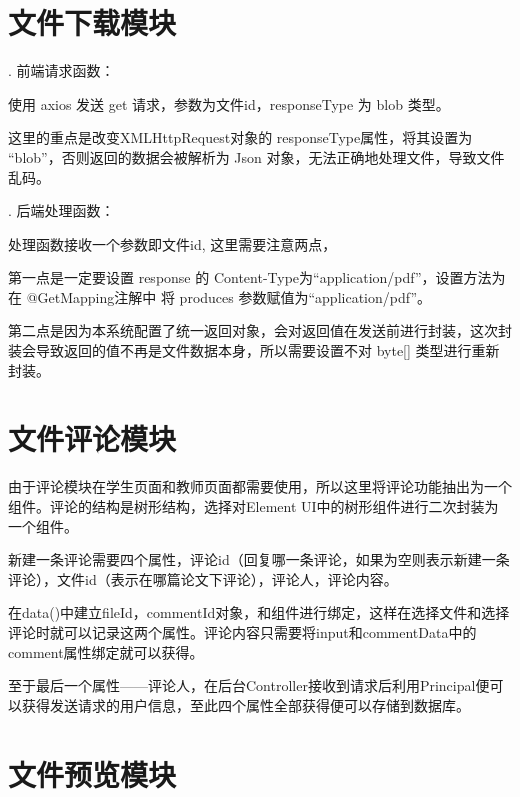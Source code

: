 \section{文件下载模块}

. 前端请求函数：

使用 axios 发送 get 请求，参数为文件id，responseType 为 blob 类型。

这里的重点是改变XMLHttpRequest对象的 responseType属性，将其设置为 “blob”，否则返回的数据会被解析为 Json 对象，无法正确地处理文件，导致文件乱码。

. 后端处理函数：

处理函数接收一个参数即文件id, 这里需要注意两点，

第一点是一定要设置 response 的 Content-Type为“application/pdf”，设置方法为在 @GetMapping注解中 将 produces 参数赋值为“application/pdf”。

第二点是因为本系统配置了统一返回对象，会对返回值在发送前进行封装，这次封装会导致返回的值不再是文件数据本身，所以需要设置不对 byte[] 类型进行重新封装。

\section{文件评论模块}

由于评论模块在学生页面和教师页面都需要使用，所以这里将评论功能抽出为一个组件。评论的结构是树形结构，选择对Element UI中的树形组件进行二次封装为一个组件。

新建一条评论需要四个属性，评论id（回复哪一条评论，如果为空则表示新建一条评论），文件id（表示在哪篇论文下评论），评论人，评论内容。

在data()中建立fileId，commentId对象，和组件进行绑定，这样在选择文件和选择评论时就可以记录这两个属性。评论内容只需要将input和commentData中的comment属性绑定就可以获得。

至于最后一个属性——评论人，在后台Controller接收到请求后利用Principal便可以获得发送请求的用户信息，至此四个属性全部获得便可以存储到数据库。

\section{文件预览模块}

